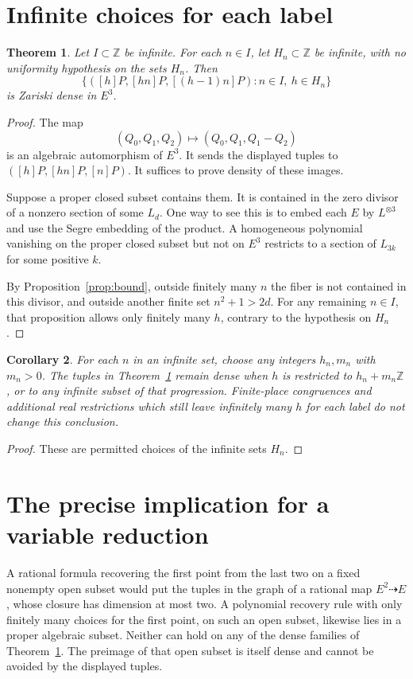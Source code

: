 \documentclass[10pt,a4paper]{article}
\newtheorem{theorem}{Theorem}[section]\newtheorem{proposition}[theorem]{Proposition}
\newtheorem{corollary}[theorem]{Corollary}
\newcommand{\Z}{\mathbb Z}\newcommand{\Q}{\mathbb Q}
\begin{document}
\section{Infinite choices for each label}
\begin{theorem}\label{thm:dense}
Let $I\subset\Z$ be infinite. For each $n\in I$, let
$H_n\subset\Z$ be infinite, with no uniformity hypothesis on the sets
$H_n$. Then
\[
 \{([h]P,[hn]P,[(h-1)n]P):n\in I,\ h\in H_n\}
\]
is Zariski dense in $E^3$.
\end{theorem}
\begin{proof}
The map
\[
 (Q_0,Q_1,Q_2)\longmapsto(Q_0,Q_1,Q_1-Q_2)
\]
is an algebraic automorphism of $E^3$. It sends the displayed tuples
to $([h]P,[hn]P,[n]P)$. It suffices to prove density of these images.

Suppose a proper closed subset contains them. It is contained in the
zero divisor of a nonzero section of some $L_d$. One way to see this
is to embed each $E$ by $L^{\otimes3}$ and use the Segre embedding of
the product. A homogeneous polynomial vanishing on the proper closed
subset but not on $E^3$ restricts to a section of $L_{3k}$ for some
positive $k$.

By Proposition~\ref{prop:bound}, outside finitely many $n$ the fiber
is not contained in this divisor, and outside another finite set
$n^2+1>2d$. For any remaining $n\in I$, that proposition allows only
finitely many $h$, contrary to the hypothesis on $H_n$.
\end{proof}

\begin{corollary}\label{cor:crt}
For each $n$ in an infinite set, choose any integers $h_n,m_n$ with
$m_n>0$. The tuples in Theorem~\ref{thm:dense} remain dense when $h$
is restricted to $h_n+m_n\Z$, or to any infinite subset of that
progression. Finite-place congruences and additional real restrictions
which still leave infinitely many $h$ for each label do not change
this conclusion.
\end{corollary}
\begin{proof}
These are permitted choices of the infinite sets $H_n$.
\end{proof}

\section{The precise implication for a variable reduction}
A rational formula recovering the first point from the last two on
a fixed nonempty open subset would put the tuples in the graph of a
rational map $E^2\dashrightarrow E$, whose closure has dimension at
most two. A polynomial recovery rule with only finitely many choices
for the first point, on such an open subset, likewise lies in a
proper algebraic subset. Neither can hold on any of the dense families
of Theorem~\ref{thm:dense}. The preimage of that open subset is itself
dense and cannot be avoided by the displayed tuples.
\end{document}

